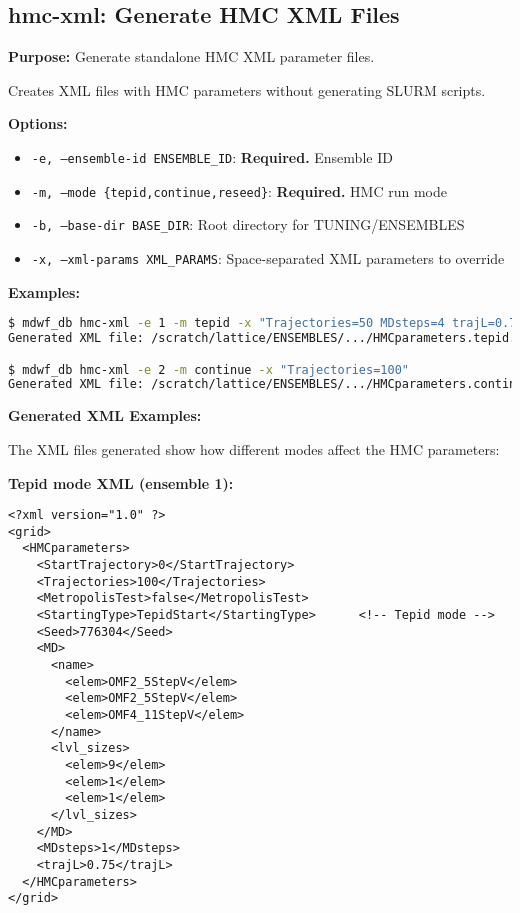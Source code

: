\documentclass{article}
\begin{document}
\subsection{hmc-xml: Generate HMC XML Files}

\textbf{Purpose:} Generate standalone HMC XML parameter files.

Creates XML files with HMC parameters without generating SLURM scripts.

\textbf{Options:}
\begin{itemize}
\item \texttt{-e, --ensemble-id ENSEMBLE\_ID}: \textbf{Required.} Ensemble ID
\item \texttt{-m, --mode \{tepid,continue,reseed\}}: \textbf{Required.} HMC run mode
\item \texttt{-b, --base-dir BASE\_DIR}: Root directory for TUNING/ENSEMBLES
\item \texttt{-x, --xml-params XML\_PARAMS}: Space-separated XML parameters to override
\end{itemize}

\textbf{Examples:}
\begin{lstlisting}[language=bash]
$ mdwf_db hmc-xml -e 1 -m tepid -x "Trajectories=50 MDsteps=4 trajL=0.75"
Generated XML file: /scratch/lattice/ENSEMBLES/.../HMCparameters.tepid.xml

$ mdwf_db hmc-xml -e 2 -m continue -x "Trajectories=100"
Generated XML file: /scratch/lattice/ENSEMBLES/.../HMCparameters.continue.xml
\end{lstlisting}

\textbf{Generated XML Examples:}

The XML files generated show how different modes affect the HMC parameters:

\textbf{Tepid mode XML (ensemble 1):}
\begin{lstlisting}
<?xml version="1.0" ?>
<grid>
  <HMCparameters>
    <StartTrajectory>0</StartTrajectory>
    <Trajectories>100</Trajectories>
    <MetropolisTest>false</MetropolisTest>
    <StartingType>TepidStart</StartingType>      <!-- Tepid mode -->
    <Seed>776304</Seed>
    <MD>
      <name>
        <elem>OMF2_5StepV</elem>
        <elem>OMF2_5StepV</elem>
        <elem>OMF4_11StepV</elem>
      </name>
      <lvl_sizes>
        <elem>9</elem>
        <elem>1</elem>
        <elem>1</elem>
      </lvl_sizes>
    </MD>
    <MDsteps>1</MDsteps>
    <trajL>0.75</trajL>
  </HMCparameters>
</grid>
\end{lstlisting}
\end{document}
